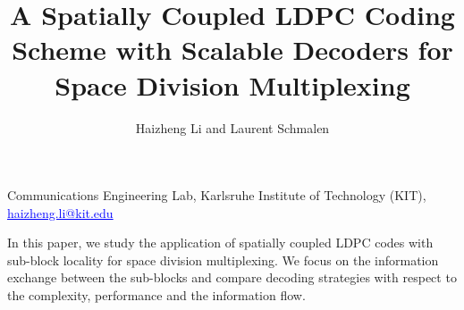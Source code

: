 \documentclass[a4paper, oneside, twocolumn, notitlepage, 10pt]{extarticle_ecoc}
\begin{document}


\title{A Spatially Coupled LDPC Coding Scheme  with Scalable Decoders for Space Division Multiplexing}%


\author{
    Haizheng Li and Laurent Schmalen
}

\maketitle                  %


\begin{strip}
 \begin{author_descr}
   
   Communications Engineering Lab, Karlsruhe Institute of Technology (KIT), \textcolor{blue}{\uline{haizheng.li@kit.edu}}
   
 \end{author_descr}
\end{strip}

\renewcommand\footnotemark{}
\renewcommand\footnoterule{}

\newcommand\extrafootertext[1]{%
    \bgroup
    \renewcommand\thefootnote{\fnsymbol{footnote}}%
    \renewcommand\thempfootnote{\fnsymbol{mpfootnote}}%
    \footnotetext[0]{#1}%
    \egroup
}

\begin{strip}
  \begin{ecoc_abstract}
    In this paper, we study the application of spatially coupled LDPC codes with sub-block locality for space division multiplexing. We focus on the information exchange between the sub-blocks and compare decoding strategies with respect to the complexity, performance and the information flow. %
  \end{ecoc_abstract}
\end{strip}






\clearpage
\newpage
\printbibliography

\vspace{-4mm}
\end{document}
